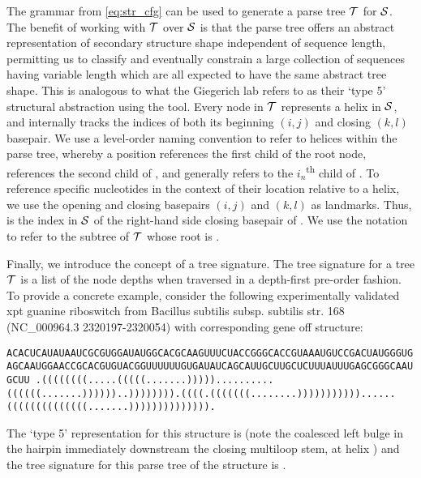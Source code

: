 The grammar from \eqref{eq:str_cfg} can be used to generate a parse tree ${\mathcal T}$ for $\mathcal S$. The benefit of working with ${\mathcal T}$ over $\mathcal S$ is that the parse tree offers an abstract representation of secondary structure shape independent of sequence length, permitting us to classify and eventually constrain a large collection of sequences having variable length which are all expected to have the same abstract tree shape. This is analogous to what the Giegerich lab refers to as their `type 5' structural abstraction using the \rshapes tool. Every node in ${\mathcal T}$ represents a helix in $\mathcal S$, and internally tracks the indices of both its beginning $(i,j)$ and closing $(k,l)$ basepair. We use a level-order naming convention to refer to helices within the parse tree, whereby a position  references the first child of the root node,  references the second child of , and generally  refers to the $i_n$\textsuperscript{th} child of . To reference specific nucleotides in the context of their location relative to a helix, we use the opening and closing basepairs $(i,j)$ and $(k,l)$ as landmarks. Thus,  is the index in $\mathcal S$ of the right-hand side closing basepair of . We use the notation  to refer to the subtree of ${\mathcal T}$ whose root is .

Finally, we introduce the concept of a tree signature. The tree signature for a tree ${\mathcal T}$ is a list of the node depths when traversed in a depth-first pre-order fashion. To provide a concrete example, consider the following experimentally validated xpt guanine riboswitch from Bacillus subtilis subsp. subtilis str. 168 (NC\_000964.3 2320197-2320054) with corresponding gene off structure:

\begin{center} \label{}
  \small\tt ACACUCAUAUAAUCGCGUGGAUAUGGCACGCAAGUUUCUACCGGGCACCGUAAAUGUCCGACUAUGGGUGAGCAAUGGAACCGCACGUGUACGGUUUUUUGUGAUAUCAGCAUUGCUUGCUCUUUAUUUGAGCGGGCAAUGCUU
  \small\tt .((((((((.....(((((.......)))))..........((((((.......))))))..)))))))).((((.(((((((........)))))))))))......((((((((((((((.......)))))))))))))).
\end{center}

The \rshapes `type 5' representation for this structure is \ms{[[][]][][]} (note the coalesced left bulge in the hairpin immediately downstream the closing multiloop stem, at helix ) and the tree signature for this parse tree of the structure is \ms{[0, 1, 2, 2, 1, 1]}.


